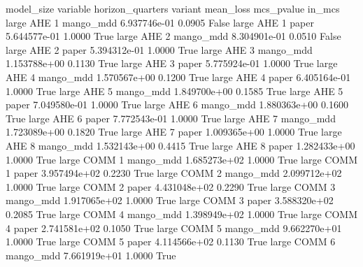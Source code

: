 model_size variable  horizon_quarters               variant    mean_loss  mcs_pvalue  in_mcs
     large      AHE                 1             mango_mdd 6.937746e-01      0.0905   False
     large      AHE                 1                 paper 5.644577e-01      1.0000    True
     large      AHE                 2             mango_mdd 8.304901e-01      0.0510   False
     large      AHE                 2                 paper 5.394312e-01      1.0000    True
     large      AHE                 3             mango_mdd 1.153788e+00      0.1130    True
     large      AHE                 3                 paper 5.775924e-01      1.0000    True
     large      AHE                 4             mango_mdd 1.570567e+00      0.1200    True
     large      AHE                 4                 paper 6.405164e-01      1.0000    True
     large      AHE                 5             mango_mdd 1.849700e+00      0.1585    True
     large      AHE                 5                 paper 7.049580e-01      1.0000    True
     large      AHE                 6             mango_mdd 1.880363e+00      0.1600    True
     large      AHE                 6                 paper 7.772543e-01      1.0000    True
     large      AHE                 7             mango_mdd 1.723089e+00      0.1820    True
     large      AHE                 7                 paper 1.009365e+00      1.0000    True
     large      AHE                 8             mango_mdd 1.532143e+00      0.4415    True
     large      AHE                 8                 paper 1.282433e+00      1.0000    True
     large     COMM                 1             mango_mdd 1.685273e+02      1.0000    True
     large     COMM                 1                 paper 3.957494e+02      0.2230    True
     large     COMM                 2             mango_mdd 2.099712e+02      1.0000    True
     large     COMM                 2                 paper 4.431048e+02      0.2290    True
     large     COMM                 3             mango_mdd 1.917065e+02      1.0000    True
     large     COMM                 3                 paper 3.588320e+02      0.2085    True
     large     COMM                 4             mango_mdd 1.398949e+02      1.0000    True
     large     COMM                 4                 paper 2.741581e+02      0.1050    True
     large     COMM                 5             mango_mdd 9.662270e+01      1.0000    True
     large     COMM                 5                 paper 4.114566e+02      0.1130    True
     large     COMM                 6             mango_mdd 7.661919e+01      1.0000    True
